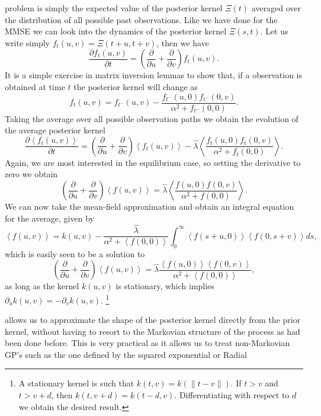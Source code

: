 problem is simply the expected value of the posterior kernel $\Xi(t)$ averaged over the distribution of all possible past observations. Like we have done for the 
MMSE we can look into the dynamics of the posterior kernel $\Xi(s,t)$. Let us write simply $f_t(u,v) = \Xi(t+u,t+v)$, then we have
\[
\frac{\partial f_t(u,v)}{\partial t} = \left( \frac{\partial }{\partial u}+ \frac{\partial }{\partial v}\right) f_t(u,v).
\]
It is a simple exercise in matrix inversion lemmas to show that, if a observation is obtained at time $t$ the posterior kernel will change as
\[
f_t(u,v) = f_{t^-}(u,v) - \frac{f_{t^-}(u,0)f_{t^-}(0,v)}{\alpha^2+ f_{t^-}(0,0)}.
\]
Taking the average over all possible observation paths we obtain the evolution of the average posterior kernel
\[
\frac{\partial \left<f_t(u,v)\right>}{\partial t} = \left( \frac{\partial }{\partial u}+ \frac{\partial }{\partial v}\right) \left<f_t(u,v)\right> - \hat{\lambda} \left<\frac{f_{t}(u,0)f_{t}(0,v)}{\alpha^2+ f_{t}(0,0)}\right>.
\]
Again, we are most interested in the equilibrium case, so setting the derivative to zero we obtain
\begin{equation}
\label{eq:differential_kernel}
\left( \frac{\partial }{\partial u}+ \frac{\partial }{\partial v}\right) \left<f(u,v)\right> = \hat{\lambda} \left<\frac{f(u,0)f(0,v)}{\alpha^2+ f(0,0)}\right>.
\end{equation}
We can now take the mean-field approximation and obtain an integral equation for the average, given by
\begin{equation}
\label{eq:integral_kernel}
\left<f(u,v)\right> = k(u,v) - \frac{\hat{\lambda}}{\alpha^2+ \left<f(0,0)\right>} \int_0^\infty \left<f(s+u,0)\right>\left<f(0,s+v)\right> ds,
\end{equation}
which is easily seen to be a solution to
\[
\left( \frac{\partial }{\partial u}+ \frac{\partial }{\partial v}\right) \left<f(u,v)\right> = \hat{\lambda} \frac{\left<f(u,0)\right>\left<f(0,v)\right>}{\alpha^2+ \left<f(0,0)\right>},
\]
as long as the kernel $k(u,v)$ is stationary, which implies $\partial_u k(u,v) = - \partial_v k(u,v)$. \footnote{A stationary kernel is such that 
$k(t,v) = k(\|t-v\|)$. If $t > v$ and $t> v+d$, then $k(t,v+d) = k(t-d,v)$. Differentiating with respect to $d$ we obtain the desired result.}\par
{} allows us to approximate the shape of the posterior kernel directly from the prior kernel, without having to resort to the Markovian structure of
the process as had been done before. This is very practical as it allows us to treat non-Markovian GP's such as the one defined by the squared exponential or Radial
